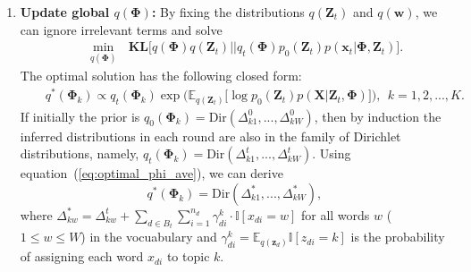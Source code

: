 \documentclass[twoside,11pt]{article}
\newcommand{\xv}{\bm{x}}
\newcommand{\Xv}{\bm{X}}
\newcommand{\zv}{\bm{z}}
\newcommand{\Zv}{\bm{Z}}
\newcommand{\wv}{\bm{w}}
\newcommand{\Phiv}{\bm{\Phi}}
\newcommand{\muv}{\bm \mu}
\newcommand{\Sigmav}{\bm \Sigma}
\newcommand{\ep}{\mathbb{E}}
\newcommand{\KL}{\textbf{KL}}
\newcommand\refeq[1]{(\ref{#1})}
\begin{document}
\begin{enumerate}
\item \textbf{Update global $q(\Phiv)$: }  By fixing the distributions $q(\Zv_t)$ and $q(\wv)$, we can ignore irrelevant terms and solve
\setlength\arraycolsep{0 pt}\begin{eqnarray*}
&& \underset{q(\Phiv)}{\operatorname{min}}{~~~\KL\Big[q(\Phiv) q(\Zv_t) || q_t(\Phiv) p_0(\Zv_t) p(\xv_t | \Phiv, \Zv_t) \Big]}.
\end{eqnarray*}
The optimal solution has the following closed form:
\setlength\arraycolsep{0pt} \begin{eqnarray} \label{eq:optimal_phi_ave}
&& q^*(\bm{\Phi}_k) \propto q_t(\Phiv_k) \exp\Big( \ep_{q(\Zv_t)} \Big[\log p_0(\Zv_t) p(\Xv|\Zv_t, \Phiv) \Big]  \Big), ~~  k = 1,2,...,K. %
\end{eqnarray}
If initially the prior is $q_0(\Phiv_k) = \text{Dir}(\Delta_{k1}^{0}, ..., \Delta_{kW}^{0})$, %
then by induction the inferred distributions in each round are also in the family of Dirichlet distributions, namely, $q_t(\Phiv_k) = \text{Dir}(\Delta_{k1}^{t}, ..., \Delta_{kW}^{t})$. %
Using equation~\refeq{eq:optimal_phi_ave}, we can derive
\setlength\arraycolsep{1pt} \begin{equation}\label{eq:lda_phi2}
q^*(\bm{\Phi}_k) = \text{Dir}(\Delta_{k1}^*, ..., \Delta_{kW}^*),
\end{equation}
where $\Delta_{kw}^* = \Delta_{kw}^t + \sum_{d \in B_t}\sum_{i = 1}^{n_d}{ \gamma_{di}^k \cdot \mathbb{I}[x_{di} = w]}$ for all words $w$ ($1 \leq w \leq W$) in the vocuabulary and $\gamma_{di}^k = \ep_{q(\zv_d)} \mathbb{I}[z_{di} = k]$ is the probability of assigning each word $x_{di}$ to topic $k$.


\end{enumerate}
\end{document}
